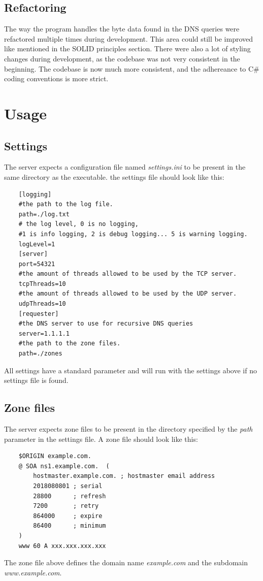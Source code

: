 \documentclass[12pt]{article}
\begin{document}
\subsection{Refactoring}
The way the program handles the byte data found in the DNS queries were refactored multiple times during development.
This area could still be improved like mentioned in the SOLID principles section. There were also a lot of styling changes during development,
as the codebase was not very consistent in the beginning. The codebase is now much more consistent, and the adhereance to C\# coding conventions\cite{billwagnerNETDocumentationCoding2023} is
more strict.

\section{Usage}
\subsection{Settings}
The server expects a configuration file named \textit{settings.ini} to be present in the same directory as the executable.
the settings file should look like this:
\begin{lstlisting}
    [logging]
    #the path to the log file.
    path=./log.txt
    # the log level, 0 is no logging, 
    #1 is info logging, 2 is debug logging... 5 is warning logging.
    logLevel=1
    [server]
    port=54321
    #the amount of threads allowed to be used by the TCP server.
    tcpThreads=10
    #the amount of threads allowed to be used by the UDP server.
    udpThreads=10
    [requester]
    #the DNS server to use for recursive DNS queries
    server=1.1.1.1
    #the path to the zone files.
    path=./zones
\end{lstlisting}
All settings have a standard parameter and will run with the settings above if no settings file is found.

\subsection{Zone files}
The server expects zone files to be present in the directory specified by the \textit{path} parameter in the settings file.
A zone file should look like this:
\begin{lstlisting}
    $ORIGIN example.com.
    @ SOA ns1.example.com.  (
        hostmaster.example.com. ; hostmaster email address
        2018080801 ; serial
        28800      ; refresh
        7200       ; retry
        864000     ; expire
        86400      ; minimum
    )
    www 60 A xxx.xxx.xxx.xxx
\end{lstlisting}
The zone file above defines the domain name \textit{example.com} and the subdomain \textit{www.example.com}.

\printbibliography
\end{document}
